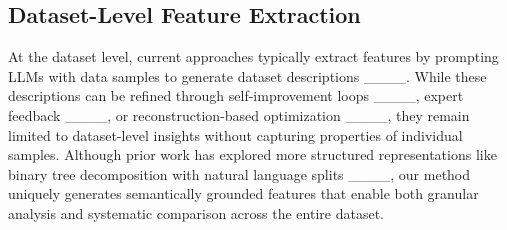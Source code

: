 \subsection{Dataset-Level Feature Extraction}

At the dataset level, current approaches typically extract features by prompting LLMs with data samples to generate dataset descriptions ____. While these descriptions can be refined through self-improvement loops ____, expert feedback ____, or reconstruction-based optimization ____, they remain limited to dataset-level insights without capturing properties of individual samples. Although prior work has explored more structured representations like binary tree decomposition with natural language splits ____, our method uniquely generates semantically grounded features that enable both granular analysis and systematic comparison across the entire dataset.